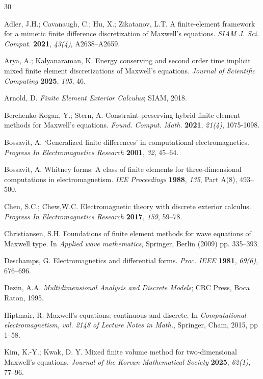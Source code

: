 \documentclass[english]{article}
\theoremstyle{plain}
\theoremstyle{definition}
\theoremstyle{remark}
\numberwithin{equation}{section}
\begin{document}
 \begin{thebibliography}{30}

 Adler, J.H.; Cavanaugh, C.; Hu, X.; Zikatanov, L.T. A finite-element framework for a mimetic finite difference
discretization of Maxwell’s equations. {\em SIAM J. Sci. Comput.} {\bf 2021}, {\em 43(4)}, A2638–A2659.

  Arya, A.;  Kalyanaraman, K.
Energy conserving and second order time implicit mixed finite element discretizations of Maxwell's equations.
 {\em Journal of Scientific Computing} {\bf 2025}, {\em 105}, 46.

  Arnold, D.  \textit{Finite Element Exterior Calculus}; SIAM, 2018.

Berchenko-Kogan, Y.; Stern, A. Constraint-preserving hybrid finite element methods for Maxwell’s equations. {\em Found. Comput. Math.} {\bf 2021}, {\em 21(4)}, 1075-1098.

Bossavit, A. ‘Generalized finite differences’ in computational electromagnetics. {\em Progress In
Electromagnetics Research} {\bf 2001}, {\em 32}, 45–64.

Bossavit, A.  Whitney forms: A class of finite elements for three-dimensional computations
in electromagnetism. {\em IEE Proceedings} {\bf 1988}, {\em 135}, Part A(8), 493--500.

Chen, S.C.; Chew,W.C. Electromagnetic theory with discrete exterior calculus. {\em Progress In Electromagnetics
Research} {\bf 2017}, {\em 159}, 59--78.

 Christiansen, S.H. Foundations of finite element methods for wave equations of Maxwell type.
 In {\em Applied wave mathematics},  Springer, Berlin (2009) pp. 335–393.

Deschamps, G. Electromagnetics and differential forms. {\em Proc. IEEE}  {\bf 1981}, {\em 69(6)}, 676--696.

Dezin, A.A.  \textit{Multidimensional Analysis and Discrete Models};
CRC Press, Boca Raton, 1995.

  Hiptmair, R.  Maxwell’s equations: continuous and discrete. In {\em Computational electromagnetism, vol. 2148 of Lecture Notes in Math.}, Springer, Cham, 2015,  pp 1–58.

Kim, K.-Y.;  Kwak, D. Y.  Mixed finite volume method for two-dimensional Maxwell's equations. {\em Journal of the Korean Mathematical Society} {\bf 2025}, {\em 62(1)}, 77–96.


\end{thebibliography}
\end{document}
